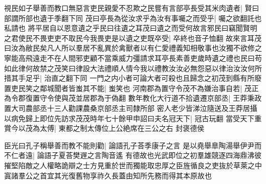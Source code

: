 視民如子舉善而教口無惡言吏民親愛不忍欺之民嘗有言部亭長受其米肉遺者|{
	賢曰部謂所部也遺于季翻下同}
茂曰亭長為從汝求乎為汝有事囑之而受乎|{
	囑之欲翻託也私請也}
將平居自以恩意遺之乎民曰往遺之耳茂曰遺之而受何故言邪民曰竊聞賢明之君使民不畏吏吏不取民今我畏吏是以遺之吏既卒受|{
	卒終也音子恤翻}
故來言耳茂曰汝為敝民矣凡人所以羣居不亂異於禽獸者以有仁愛禮義知相敬事也汝獨不欲修之寧能高飛遠走不在人間邪吏顧不當乘威力彊請求耳亭長素善吏歲時遺之禮也民曰苟如此律何故禁之茂笑曰律設大法禮順人情今我以禮教汝汝必無怨惡以律治汝汝何所措其手足乎|{
	治直之翻下同}
一門之内小者可論大者可殺也且歸念之初茂到縣有所廢置吏民笑之鄰城聞者皆蚩其不能|{
	蚩笑也}
河南郡為置守令茂不為嫌治事自若|{
	茂正為令郡復置守令使與茂並居郡為于偽翻}
數年教化大行道不拾遺遷京部丞|{
	王莽秉政置大司農部丞十三人勸課農桑京部丞主司隸所部}
密人老少皆涕泣隨送及王莽居攝以病免歸上即位先訪求茂茂時年七十餘甲申詔曰夫名冠天下|{
	冠古玩翻}
當受天下重賞今以茂為太傅|{
	東都之制太傳位上公絶席在三公之右}
封褒德侯

臣光曰孔子稱舉善而教不能則勸|{
	論語孔子荅季康子之言}
是以堯舉臯陶湯舉伊尹而不仁者遠|{
	論語子夏荅樊遟之言陶音遙}
有德故也光武即位之初羣雄競逐四海鼎沸彼摧堅陷敵之人權略詭辯之士方見重於世而獨能取忠厚之臣旌循良之吏抜於草萊之中寘諸羣公之首宜其光復舊物享祚久長蓋由知所先務而得其本原故也


